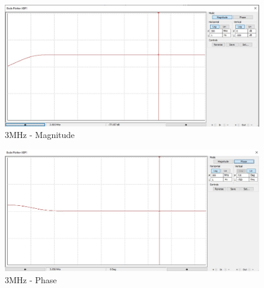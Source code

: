 \documentclass[a4paper,twoside]{report}
\begin{document}
		\begin{center}
			\begin{figure}[!h]
				\includegraphics[width=\textwidth]{Bode-3MHz-Magnitude.jpg}
				\caption{3MHz - Magnitude}
				\label{fig:bode-3MHz-Magnitude}
			\end{figure}
			\begin{figure}[!h]
				\includegraphics[width=\textwidth]{Bode-3MHz-Phase.jpg}
				\caption{3MHz - Phase}
				\label{fig:bode-3MHz-Phase}
			\end{figure}
		\end{center}
	\vfill
	\pagebreak
\end{document}
